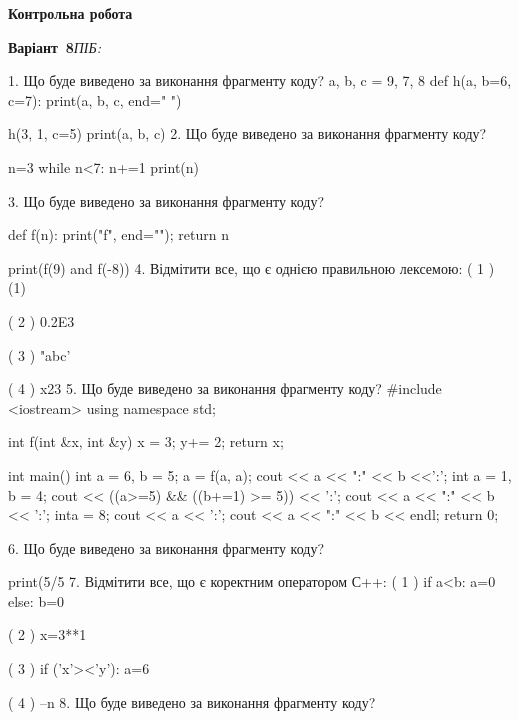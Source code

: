 \documentclass[11pt]{article}
\begin{document}
{\large\textbf{Контрольна робота}}

\textbf{Варіант \No\,8}\hfill \textit{ПІБ:}\,\underline{\hspace{60mm}}
\vspace{4mm}

1. Що буде виведено за виконання фрагменту коду?
a, b, c = 9, 7, 8
def h(a, b=6, c=7):
    print(a, b, c, end=" ")

h(3, 1, c=5)
print(a, b, c)
\vspace{5mm}
2. Що буде виведено за виконання фрагменту коду?

n=3
while n<7:
    n+=1
print(n)

\vspace{5mm}
3. Що буде виведено за виконання фрагменту коду?

def f(n):
    print("f", end="");
    return n

print(f(9) and f(-8))
\vspace{5mm}
4. %
Відмітити все, що є однією правильною лексемою:
( 1 ) (1)

( 2 ) 0.2E3

( 3 ) "abc'

( 4 ) x23
\vspace{5mm}
5. Що буде виведено за виконання фрагменту коду?
#include <iostream>
using namespace std;

int f(int &x, int &y){
    x = 3;
    y+= 2;
    return x;
}

int main(){
    int a = 6, b = 5;
    a = f(a, a);
    cout << a << ":" << b <<':';
    {
        int a = 1, b = 4;
        cout << ((a>=5) && ((b+=1) >= 5)) << ':';
        cout << a << ":" << b << ':';
    }
    {
        inta = 8;
        cout << a << ':';
    }
    cout << a << ":" << b << endl;
    return 0;
}

\vspace{5mm}
6. Що буде виведено за виконання фрагменту коду?

print(5/5%
\vspace{5mm}
7. %
Відмітити все, що є коректним оператором С++:
( 1 ) if a<b: a=0 else: b=0

( 2 ) x=3**1

( 3 ) if ('x'><'y'): a=6

( 4 ) --n
\vspace{5mm}
8. Що буде виведено за виконання фрагменту коду?
\end{document}
